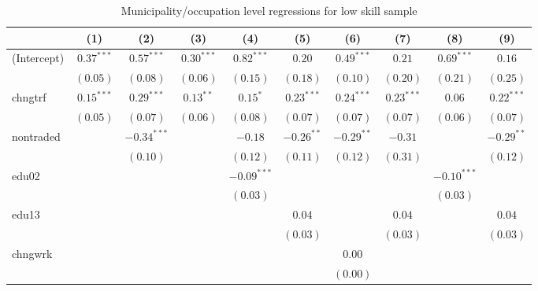 
\begin{table}
\caption{Municipality/occupation level regressions for low skill sample}
\begin{center}
\begin{tabular}{l c c c c c c c c c }
\hline
 & (1) & (2) & (3) & (4) & (5) & (6) & (7) & (8) & (9) \\
\hline
(Intercept)          & $0.37^{***}$ & $0.57^{***}$  & $0.30^{***}$ & $0.82^{***}$  & $0.20$       & $0.49^{***}$ & $0.21$       & $0.69^{***}$  & $0.16$       \\
                     & $(0.05)$     & $(0.08)$      & $(0.06)$     & $(0.15)$      & $(0.18)$     & $(0.10)$     & $(0.20)$     & $(0.21)$      & $(0.25)$     \\
chngtrf              & $0.15^{***}$ & $0.29^{***}$  & $0.13^{**}$  & $0.15^{*}$    & $0.23^{***}$ & $0.24^{***}$ & $0.23^{***}$ & $0.06$        & $0.22^{***}$ \\
                     & $(0.05)$     & $(0.07)$      & $(0.06)$     & $(0.08)$      & $(0.07)$     & $(0.07)$     & $(0.07)$     & $(0.06)$      & $(0.07)$     \\
nontraded            &              & $-0.34^{***}$ &              & $-0.18$       & $-0.26^{**}$ & $-0.29^{**}$ & $-0.31$      &               & $-0.29^{**}$ \\
                     &              & $(0.10)$      &              & $(0.12)$      & $(0.11)$     & $(0.12)$     & $(0.31)$     &               & $(0.12)$     \\
edu02                &              &               &              & $-0.09^{***}$ &              &              &              & $-0.10^{***}$ &              \\
                     &              &               &              & $(0.03)$      &              &              &              & $(0.03)$      &              \\
edu13                &              &               &              &               & $0.04$       &              & $0.04$       &               & $0.04$       \\
                     &              &               &              &               & $(0.03)$     &              & $(0.03)$     &               & $(0.03)$     \\
chngwrk              &              &               &              &               &              & $0.00$       &              &               &              \\
                     &              &               &              &               &              & $(0.00)$     &              &               &              \\

\end{tabular}
\end{center}
\end{table}
